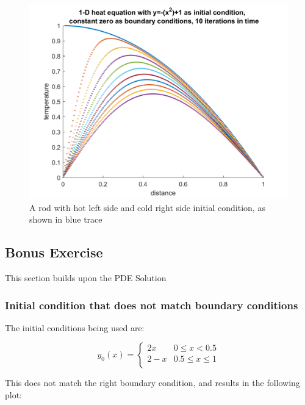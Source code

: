 \documentclass[a4paper, 12pt]{article}
\begin{document}
\begin{figure}[h]
\centering
\includegraphics[width=\textwidth]{ex4/plots/custom_mountain.png}
\caption{A rod with hot left side and cold right side initial condition, as shown in blue trace}
\end{figure}


\newpage
\subsection{Bonus Exercise}
This section builds upon the PDE Solution
\subsubsection{Initial condition that does not match boundary
conditions}
The initial conditions being used are:

\[ y_0(\textit{x})=
	\begin{cases} 
      2x & 0\leq x < 0.5 \\
      2-x & 0.5\leq x\leq 1 \\
   \end{cases}\]
\newline

This does not match the right boundary condition, and results in the following plot:
\end{document}
